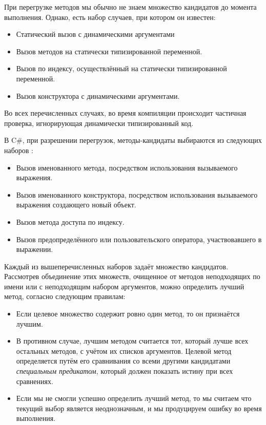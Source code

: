 При перегрузке методов мы обычно не знаем множество кандидатов до момента выполнения. Однако, есть набор случаев, при котором он известен:
\begin{itemize}
    \item Статический вызов с динамическими аргументами
    \item Вызов методов на статически типизированной переменной. 
    \item Вызов по индексу, осуществлённый на статически типизированной переменной. 
    \item Вызов конструктора с динамическими аргументами. 
\end{itemize}
Во всех перечисленных случаях, во время компиляции происходит частичная проверка, игнорирующая динамически типизированный код. 

В C{\#}, при разрешении перегрузок, методы-кандидаты выбираются из следующих наборов \cite{csharp:languageSpecification}:

\begin{itemize}
    \item Вызов именованного метода, посредством использования вызываемого выражения.
    \item Вызов именованного конструктора, посредством использования вызываемого выражения создающего новый объект.
    \item Вызов метода доступа по индексу.
    \item Вызов предопределённого или пользовательского оператора, участвовавшего в выражении.
\end{itemize}

Каждый из вышеперечисленных наборов задаёт множество кандидатов. Рассмотрев объединение этих множеств, очищенное от методов неподходящих по имени или с неподходящим набором аргументов, можно определить лучший метод, согласно следующим правилам:

\begin{itemize}
    \item Если целевое множество содержит ровно один метод, то он признаётся лучшим.
    \item В противном случае, лучшим методом считается тот, который лучше всех остальных методов, с учётом их списков аргументов. Целевой метод определяется путём его сравнивания со всеми другими кандидатами \textit{специальным предикатом}, который должен показать истину при всех сравнениях.
    \item Если мы не смогли успешно определить лучший метод, то мы считаем что текущий выбор является неоднозначным, и мы продуцируем ошибку во время выполнения.
\end{itemize}

